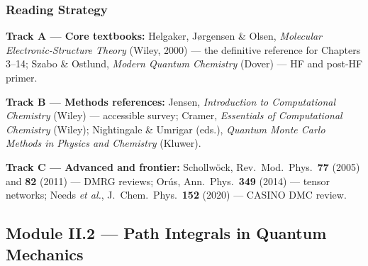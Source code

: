 \documentclass[11pt,a4paper]{article}
\begin{document}
\subsubsection*{Reading Strategy}

\noindent\textbf{Track A --- Core textbooks:}
Helgaker, J\o rgensen \& Olsen, \textit{Molecular Electronic-Structure Theory} (Wiley, 2000) ---
the definitive reference for Chapters 3--14;
Szabo \& Ostlund, \textit{Modern Quantum Chemistry} (Dover) --- HF and post-HF primer.

\noindent\textbf{Track B --- Methods references:}
Jensen, \textit{Introduction to Computational Chemistry} (Wiley) --- accessible survey;
Cramer, \textit{Essentials of Computational Chemistry} (Wiley);
Nightingale \& Umrigar (eds.), \textit{Quantum Monte Carlo Methods in Physics and Chemistry} (Kluwer).

\noindent\textbf{Track C --- Advanced and frontier:}
Schollw\"ock, Rev.\ Mod.\ Phys.\ \textbf{77} (2005) and \textbf{82} (2011) --- DMRG reviews;
Or\'us, Ann.\ Phys.\ \textbf{349} (2014) --- tensor networks;
Needs \textit{et al.}, J.\ Chem.\ Phys.\ \textbf{152} (2020) --- CASINO DMC review.

\subsection{Module II.2 --- Path Integrals in Quantum Mechanics}
\label{sec:mod-II2}

\end{document}
